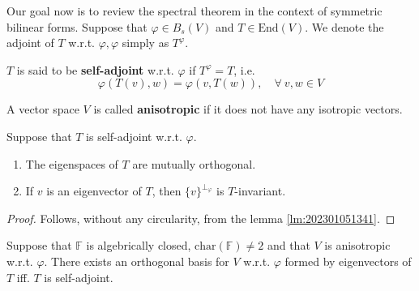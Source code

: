 Our goal now is to review the spectral theorem in the context of symmetric bilinear forms. Suppose that $\varphi \in B_s(V)$ and $T \in \text{End}(V)$. We denote the adjoint of $T$ w.r.t. $\varphi, \varphi$ simply as $T^\varphi$. 

\begin{definition}
  $T$ is said to be \textbf{self-adjoint} w.r.t. $\varphi$ if $T^\varphi = T$, i.e. 
  \[
    \varphi(T(v), w) = \varphi(v, T(w)), \quad \forall~v,w \in V
  \]
\end{definition}

\begin{definition}
  A vector space $V$ is called \textbf{anisotropic} if it does not have any isotropic vectors. 
\end{definition}

\begin{lemma}\label{lm:202301051141}
  Suppose that $T$ is self-adjoint w.r.t. $\varphi$.
  \begin{enumerate}
    \item The eigenspaces of $T$ are mutually orthogonal. 
    \item If $v$ is an eigenvector of $T$, then $\{ v \}^{\perp_\varphi}$ is $T$-invariant. 
  \end{enumerate}
\end{lemma}

\begin{proof}
  Follows, without any circularity, from the lemma \ref{lm:202301051341}.
\end{proof}

\begin{theorem}\label{thm:spectral_theorem_1}
  Suppose that $\mathbb{F}$ is algebrically closed, $\text{char}(\mathbb{F}) \neq 2$ and that $V$ is anisotropic w.r.t. $\varphi$. There exists an orthogonal basis for $V$ w.r.t. $\varphi$ formed by eigenvectors of $T$ iff. $T$ is self-adjoint. 
\end{theorem}


